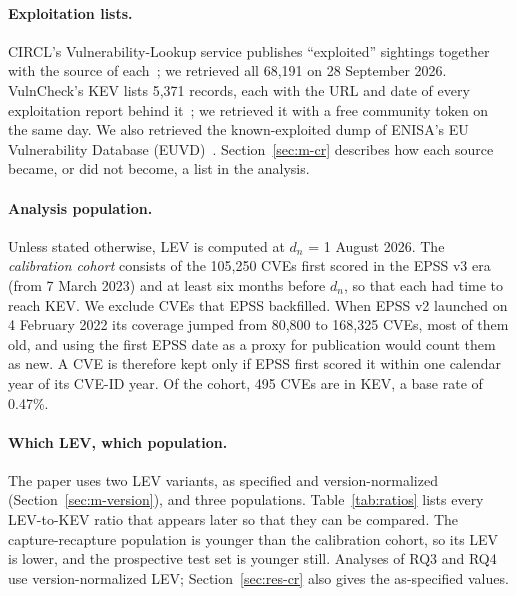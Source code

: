 \paragraph{Exploitation lists.} CIRCL's Vulnerability-Lookup service publishes
``exploited'' sightings together with the source of each~\cite{circl2026lookup};
we retrieved all 68,191 on 28 September 2026. VulnCheck's KEV lists 5,371
records, each with the URL and date of every exploitation report behind
it~\cite{vulncheck2026kev}; we retrieved it with a free community token on the
same day. We also retrieved the known-exploited dump of ENISA's EU
Vulnerability Database (EUVD)~\cite{enisa2026euvd}.
Section~\ref{sec:m-cr} describes how each source became, or did not become, a
list in the analysis.

\paragraph{Analysis population.} Unless stated otherwise, LEV is computed at
$d_n$ = 1 August 2026. The \emph{calibration cohort} consists of the 105,250
CVEs first scored in the EPSS v3 era (from 7 March 2023) and at least six
months before $d_n$, so that each had time to reach KEV. We exclude CVEs that
EPSS backfilled. When EPSS v2 launched on 4 February 2022 its coverage jumped
from 80,800 to 168,325 CVEs, most of them old, and using the first EPSS date as
a proxy for publication would count them as new. A CVE is therefore kept only
if EPSS first scored it within one calendar year of its CVE-ID year. Of the
cohort, 495 CVEs are in KEV, a base rate of 0.47\%.

\paragraph{Which LEV, which population.} The paper uses two LEV variants, as
specified and version-normalized (Section~\ref{sec:m-version}), and three
populations. Table~\ref{tab:ratios} lists every LEV-to-KEV ratio that appears
later so that they can be compared. The capture-recapture population is younger
than the calibration cohort, so its LEV is lower, and the prospective test set
is younger still. Analyses of RQ3 and RQ4 use version-normalized LEV;
Section~\ref{sec:res-cr} also gives the as-specified values.

